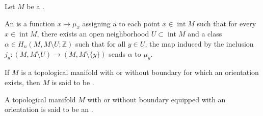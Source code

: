 \begin{definition} \label{definition:orientation_of_a_topological_manifold_with_or_without_boundary_using_singular_homology}
Let $M$ be a .

An  is a function $x \mapsto \mu_x$ assigning a  to each point $x \in \operatorname{int} M$  such that for every $x \in \operatorname{int} M$, there exists an open neighborhood $U \subset \operatorname{int} M$ and a class $\alpha \in H_n(M, M \setminus U; \mathbb{Z})$ such that for all $y \in U$, the map induced by the inclusion $j_y: (M, M \setminus U) \to (M, M \setminus \{y\})$ sends $\alpha$ to $\mu_y$.

If $M$ is a topological manifold with or without boundary for which an orientation exists, then $M$ is said to be .

A topological manifold $M$ with or without boundary equipped with an orientation is said to be an . 
\end{definition}
